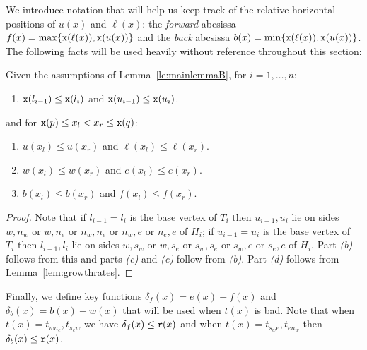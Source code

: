 We introduce notation that will help us keep track of the relative horizontal
positions of $u(x)$ and $\ell(x)$: the {\em forward} abcsissa 
$f(x) = \max\{{\tt x}(\ell(x)), {\tt x}(u(x))\}$ and the {\em back} abcsissa
$b(x) = \min\{{\tt x}(\ell(x)), {\tt x}(u(x))\}$. The following facts will
be used heavily without reference throughout this section:
\begin{proposition}
\label{lem:bandf}
Given the assumptions of Lemma~\ref{le:mainlemmaB}, for $i = 1,\dots,n$:
\renewcommand{\labelenumi}{(\alph{enumi})}
\begin{enumerate}
\item ${\tt x}(l_{i-1}) \leq {\tt x}(l_i)$ and ${\tt x}(u_{i-1}) \leq {\tt x}(u_i)$.
\end{enumerate}
and for ${\tt x}(p) \leq x_l < x_r \leq {\tt x}(q)$:
\begin{enumerate}
\addtocounter{enumi}{1}
\item $u(x_l) \leq u(x_r)$ and $\ell(x_l) \leq \ell(x_r)$.
\item $w(x_l) \leq w(x_r)$ and $e(x_l) \leq e(x_r)$.
\item $b(x_l) \leq b(x_r)$ and $f(x_l) \leq f(x_r)$.
\end{enumerate}
\end{proposition}

\begin{proof}
Note that if $l_{i-1}=l_i$ is the base vertex of $T_i$ then $u_{i-1}, u_i$ lie 
on sides $w, n_w$ or $w, n_e$ or $n_w, n_e$ or $n_w,e$ or $n_e, e$ of $H_i$; 
if $u_{i-1}=u_i$ is the base vertex of $T_i$ then $l_{i-1}, l_i$ lie on sides
$w, s_w$ or $w, s_e$ or $s_w, s_e$ or $s_w,e$ or $s_e, e$ of $H_i$.
Part {\it (b)} follows from this and parts {\it (c)}
and {\it (e)} follow from  {\it (b)}. Part {\it (d)} follows from 
Lemma~\ref{lem:growthrates}.
\end{proof}

%

Finally, we define key functions $\delta_f(x) = e(x) - f(x)$ and 
$\delta_b(x) = b(x) - w(x)$ that will be used when $t(x)$ is bad.
Note that when $t(x)= t_{wn_e},t_{s_ew}$ we have 
$\delta_f(x) \leq {\tt r}(x)$ and when $t(x)=t_{s_we},t_{en_w}$ 
then $\delta_b(x) \leq {\tt r}(x)$. 

